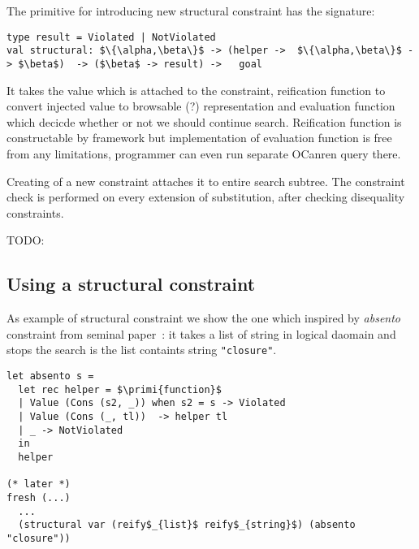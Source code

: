 The primitive for introducing new structural constraint has the signature:

\begin{lstlisting}
type result = Violated | NotViolated
val structural: $\{\alpha,\beta\}$ -> (helper ->  $\{\alpha,\beta\}$ -> $\beta$)  -> ($\beta$ -> result) ->   goal
\end{lstlisting}

It takes the value which is attached to the constraint, reification function to convert injected value to browsable (?) representation and evaluation function which decicde whether or not we should continue search. Reification function is constructable by framework but implementation of evaluation function is free from any limitations, programmer can even run separate OCanren query there.

Creating of a new constraint attaches it to entire search subtree. The constraint check is performed on every extension of substitution, after checking disequality constraints.

TODO:

\subsection{Using a structural constraint}

As example of structural constraint we show the one which inspired by \emph{absento} constraint from seminal paper~\cite{Untagged}: it takes a list of string in logical daomain and stops the search is the list containts string \texttt{"closure"}.

\begin{lstlisting}
let absento s = 
  let rec helper = $\primi{function}$
  | Value (Cons (s2, _)) when s2 = s -> Violated 
  | Value (Cons (_, tl))  -> helper tl
  | _ -> NotViolated
  in
  helper
  
(* later *)
fresh (...)
  ...
  (structural var (reify$_{list}$ reify$_{string}$) (absento "closure"))
\end{lstlisting}